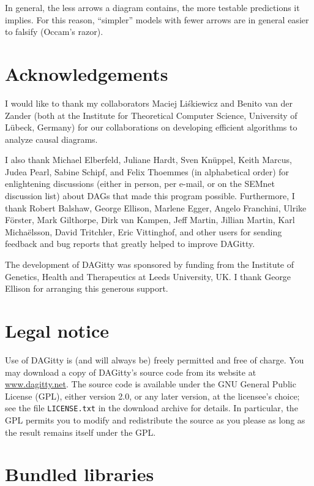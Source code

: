 \documentclass[a4paper]{article} %
\newcommand{\pp}{{\sc DAG}itty\xspace}
\begin{document}
In general, the less arrows a diagram contains, the more testable
predictions it implies. For this reason, ``simpler'' models with
fewer arrows are in general easier to falsify (Occam's razor).


\section{Acknowledgements}

I would like to thank my collaborators Maciej Li\'skiewicz
and Benito van der Zander (both at the Institute for Theoretical Computer Science,
University of L\"ubeck, Germany) for our collaborations on developing efficient algorithms
to analyze causal diagrams.  

I also thank Michael Elberfeld, Juliane Hardt, 
Sven Kn\"{u}ppel, Keith Marcus, Judea Pearl, Sabine Schipf, 
and Felix Thoemmes (in alphabetical order) for enlightening discussions
(either in person, per e-mail, or on the SEMnet discussion list)
about DAGs that made this program possible. Furthermore, I thank
Robert Balshaw, George Ellison, 
Marlene Egger, Angelo Franchini,  Ulrike F\"{o}rster, Mark Gilthorpe, 
Dirk van Kampen,
Jeff Martin, Jillian Martin, Karl Micha\"{e}lsson,
David Tritchler, Eric Vittinghof, 
and other users for sending feedback and bug reports that greatly
helped to improve \pp. 

The development of DAGitty was sponsored by funding from the 
Institute of Genetics, Health and Therapeutics at Leeds
University, UK. I thank George Ellison for arranging this
generous support.

\section{Legal notice}

Use of \pp is (and will always be) freely permitted and free of charge. 
You may download a copy of \pp's source code from its website at \url{www.dagitty.net}.
The source code is available under the GNU General Public License (GPL),
either version 2.0, or any later version, at the licensee's choice;
see the file \verb|LICENSE.txt| in the download archive for details.
In particular, the GPL permits you to  modify and redistribute the source
as you please as long as the result remains itself under the GPL.

\section{Bundled libraries}
\end{document}
